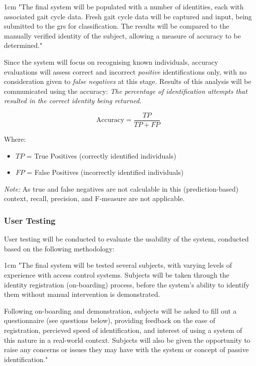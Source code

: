 \begin{adjustwidth}{1cm}{}
    "The final system will be populated with a number of identities, each with associated gait cycle data.
    Fresh gait cycle data will be captured and input, being submitted to the \ac{grs} for classification.
    The results will be compared to the manually verified identity of the subject, allowing a measure of accuracy to be determined."
\end{adjustwidth}

Since the system will focus on recognising known individuals, accuracy evaluations will assess correct and incorrect \textit{positive} identifications only, with no consideration given to \textit{false negatives} at this stage.
Results of this analysis will be communicated using the accuracy: \textit{The percentage of identification attempts that resulted in the correct identity being returned}.

\[ \text{Accuracy} = \frac{TP}{TP + FP} \]

Where:
\begin{itemize}
    \item $TP$ = True Positives (correctly identified individuals)
    \item $FP$ = False Positives (incorrectly identified individuals)
\end{itemize}

\textit{Note:} As true and false negatives are not calculable in this (prediction-based) context, recall, precision, and F-measure are not applicable.

\subsubsection{User Testing}
\label{subsec:user-testing}

User testing will be conducted to evaluate the usability of the system, conducted based on the following methodology:

\begin{adjustwidth}{1cm}{}
    "The final system will be tested several subjects, with varying levels of experience with access control systems.
    Subjects will be taken through the identity registration (on-boarding) process,
    before the system's ability to identify them without manual intervention is demonstrated.

    Following on-boarding and demonstration, subjects will be asked to fill out a questionnaire (see questions below),
    providing feedback on the ease of registration, percieved speed of identification,
    and interest of using a system of this nature in a real-world context.
    Subjects will also be given the opportunity to raise any concerns or issues they may have with the system or concept of passive identification."
\end{adjustwidth}

